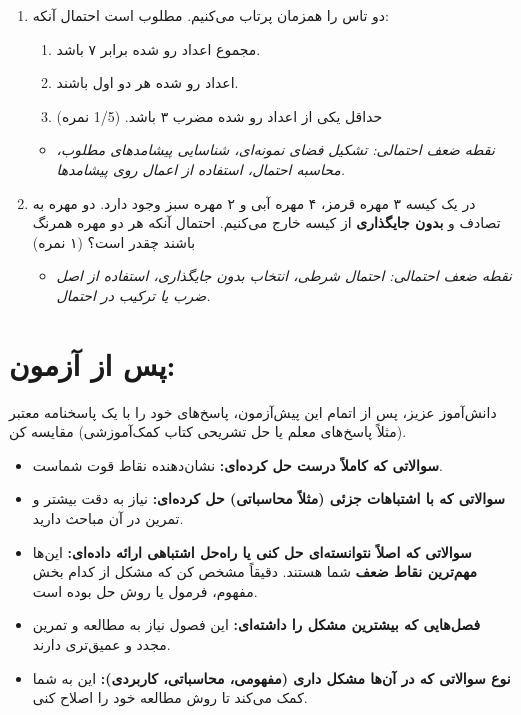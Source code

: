 \documentclass[12pt,a4paper]{article}
\begin{document}
\begin{enumerate}[label=\arabic*., start=17, rightmargin=1em, itemsep=1em]
    \item دو تاس را همزمان پرتاب می‌کنیم. مطلوب است احتمال آنکه:
    \begin{enumerate}[label=\abjad*), itemsep=0.5em]
        \item مجموع اعداد رو شده برابر ۷ باشد.
        \item اعداد رو شده هر دو اول باشند.
        \item حداقل یکی از اعداد رو شده مضرب ۳ باشد. (1/5 نمره)
    \end{enumerate}
    \begin{itemize}[label=$\circ$, rightmargin=2em]
        \item \textit{نقطه ضعف احتمالی: تشکیل فضای نمونه‌ای، شناسایی پیشامدهای مطلوب، محاسبه احتمال، استفاده از اعمال روی پیشامدها.}
    \end{itemize}

    \item در یک کیسه ۳ مهره قرمز، ۴ مهره آبی و ۲ مهره سبز وجود دارد. دو مهره به تصادف و \textbf{بدون جایگذاری} از کیسه خارج می‌کنیم. احتمال آنکه هر دو مهره همرنگ باشند چقدر است؟ (۱ نمره)
    \begin{itemize}[label=$\circ$, rightmargin=2em]
        \item \textit{نقطه ضعف احتمالی: احتمال شرطی، انتخاب بدون جایگذاری، استفاده از اصل ضرب یا ترکیب در احتمال.}
    \end{itemize}
\end{enumerate}

\hrulefill
\vspace{1em}

\section*{\textbf{پس از آزمون:}}

\noindent
دانش‌آموز عزیز، پس از اتمام این پیش‌آزمون، پاسخ‌های خود را با یک پاسخنامه معتبر (مثلاً پاسخ‌های معلم یا حل تشریحی کتاب کمک‌آموزشی) مقایسه کن.

\begin{itemize}[rightmargin=1em, itemsep=0.5em]
    \item \textbf{سوالاتی که کاملاً درست حل کرده‌ای:} نشان‌دهنده نقاط قوت شماست.
    \item \textbf{سوالاتی که با اشتباهات جزئی (مثلاً محاسباتی) حل کرده‌ای:} نیاز به دقت بیشتر و تمرین در آن مباحث دارید.
    \item \textbf{سوالاتی که اصلاً نتوانسته‌ای حل کنی یا راه‌حل اشتباهی ارائه داده‌ای:} این‌ها \textbf{مهم‌ترین نقاط ضعف} شما هستند. دقیقاً مشخص کن که مشکل از کدام بخش مفهوم، فرمول یا روش حل بوده است.
    \item \textbf{فصل‌هایی که بیشترین مشکل را داشته‌ای:} این فصول نیاز به مطالعه و تمرین مجدد و عمیق‌تری دارند.
    \item \textbf{نوع سوالاتی که در آن‌ها مشکل داری (مفهومی، محاسباتی، کاربردی):} این به شما کمک می‌کند تا روش مطالعه خود را اصلاح کنی.
\end{itemize}
\end{document}
